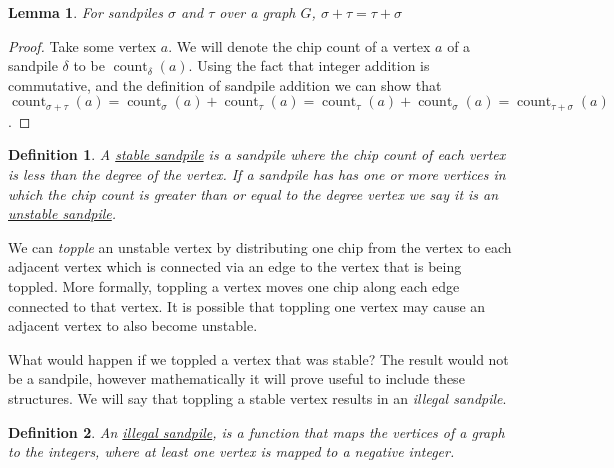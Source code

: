 \documentclass[12pt]{article}
\DeclareMathOperator{\ct}{count}
\newtheorem{lemma}{Lemma}
\newtheorem{definition}{Definition}
\begin{document}
\begin{lemma}
    For sandpiles $\sigma$ and $\tau$ over a graph $G$, $\sigma + \tau = \tau + \sigma$
\end{lemma}

\begin{proof}
    Take some vertex $a$.  We will denote the chip count of a vertex $a$ of a sandpile $\delta$ to be $\ct_\delta(a)$.  Using the fact that integer addition is commutative, and the definition of sandpile addition we can show that 
    $\ct_{\sigma + \tau}(a)=
    \ct_{\sigma}(a)+\ct_{\tau}(a)=
    \ct_{\tau}(a)+\ct_{\sigma}(a)=
    \ct_{\tau+\sigma}(a)$.   
\end{proof}

\begin{definition}
      A \underline{stable sandpile} is a sandpile where the chip count of each vertex is less than the degree of the vertex.  If a sandpile has has one or more vertices in which the chip count is greater than or equal to the degree vertex we say it is an \underline{unstable sandpile}. \cite{levine}
\end{definition}

We can \textit{topple} an unstable vertex by distributing one chip from the vertex to each adjacent vertex which is connected via an edge to the vertex that is being toppled.  More formally, toppling a vertex moves one chip along each edge connected to that vertex.  It is possible that toppling one vertex may cause an adjacent vertex to also become unstable. \cite{levine}

What would happen if we toppled a vertex that was stable?  The result would not be a sandpile, however mathematically it will prove useful to include these structures.  We will say that toppling a stable vertex results in an \textit{illegal sandpile}.

\begin{definition}
    An \underline{illegal sandpile}, is a function that maps the vertices of a graph to the integers, where at least one vertex is mapped to a negative integer.
\end{definition}
\end{document}
